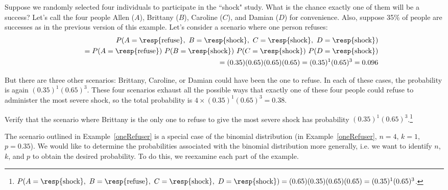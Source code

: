 \begin{example}{Suppose we randomly selected four individuals to participate in the ``shock" study. What is the chance exactly one of them will be a success?  Let's call the four people Allen ($A$), Brittany ($B$), Caroline ($C$), and Damian ($D$) for convenience. Also, suppose 35\% of people are successes as in the previous version of this example.}\label{oneRefuser}
Let's consider a scenario where one person refuses:
\begin{eqnarray*}
&&P(A=\text{\resp{refuse}},\text{ }B=\text{\resp{shock}},\text{ }C=\text{\resp{shock}},\text{ }D=\text{\resp{shock}}) \\
 &&\quad =  P(A=\text{\resp{refuse}})\ P(B=\text{\resp{shock}})\ P(C=\text{\resp{shock}})\ P(D=\text{\resp{shock}}) \\
 &&\quad =  (0.35)  (0.65)  (0.65)  (0.65) = (0.35)^1 (0.65)^3 = 0.096
\end{eqnarray*}

But there are three other scenarios: Brittany, Caroline, or Damian could have been the one to refuse. In each of these cases, the probability is again $(0.35)^1(0.65)^3$. These four scenarios exhaust all the possible ways that exactly one of these four people could refuse to administer the most severe shock, so the total probability is $4\times(0.35)^1(0.65)^3 = 0.38$.
\end{example}

\begin{exercise}
Verify that the scenario where Brittany is the only one to refuse to give the most severe shock has probability $(0.35)^1(0.65)^3$.\footnote{$P(A=\text{\resp{shock}},\text{ }B=\text{\resp{refuse}},\text{ }C=\text{\resp{shock}},\text{ }D=\text{\resp{shock}}) = (0.65)(0.35)(0.65)(0.65) = (0.35)^1(0.65)^3$.}
\end{exercise}


The scenario outlined in Example~\ref{oneRefuser} is a special case of 
the binomial distribution (in Example~\ref{oneRefuser}, $n=4$, $k=1$, $p=0.35$). 
We would like to determine the probabilities associated with the binomial distribution more generally, 
i.e. we want to identify $n$, $k$, and $p$ to obtain the desired probability. To do this, we reexamine each part of the example.


